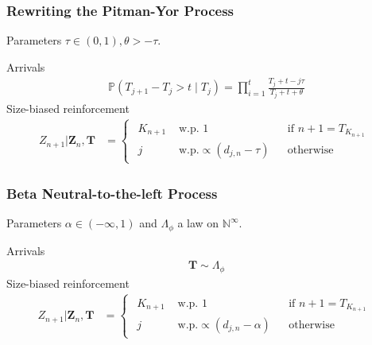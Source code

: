 \documentclass[final,hyperref={pdfpagelabels=false},noamsthm]{beamer}
\def\bbP{\mathbb{P}}
\newcommand{\ee}{Z} %
\newcommand{\bfee}{\mathbf{\ee}}
\newcommand{\bfT}{\mathbf{T}}
\begin{document}
\begin{frame}
	\frametitle{Rewriting the Pitman-Yor Process}
	Parameters $\tau \in (0, 1), \theta > -\tau$.
	\vspace{15pt}
	
	Arrivals
	\begin{align*}
	\bbP(T_{j+1} - T_j > t \mid T_j) = \prod_{i=1}^{t} \frac{T_j + t - j \tau}{T_j + t + \theta}
	\end{align*}
	Size-biased reinforcement
	\begin{align*} 
	\ee_{n+1} | \bfee_{n}, \bfT &= \begin{cases}\begin{aligned}
	K_{n+1} & \text{ w.p. } 1 && \text{if } n+1 = T_{K_{n+1}} \\
	j &\text{ w.p.} \propto (d_{j,n} - \tau) && \text{otherwise} 
	\end{aligned}\end{cases}
	\end{align*}
\end{frame}

\begin{frame}
	\frametitle{Beta Neutral-to-the-left Process \cite{Bloem2017}}
	Parameters $\alpha \in (-\infty, 1)$ and $\Lambda_\phi$ a law on $\mathbb{N}^\infty$.
	\vspace{15pt}
	
	Arrivals
	\begin{align*}
	\bfT \sim \Lambda_\phi
	\end{align*}
	Size-biased reinforcement
	\begin{align*} 
	\ee_{n+1} | \bfee_{n}, \bfT &= \begin{cases}\begin{aligned}
	K_{n+1} & \text{ w.p. } 1 && \text{if } n+1 = T_{K_{n+1}} \\
	j &\text{ w.p.} \propto (d_{j,n} - \alpha) && \text{otherwise} 
	\end{aligned}\end{cases}
	\label{eq:bntl}
	\end{align*}
\end{frame}
\end{document}
